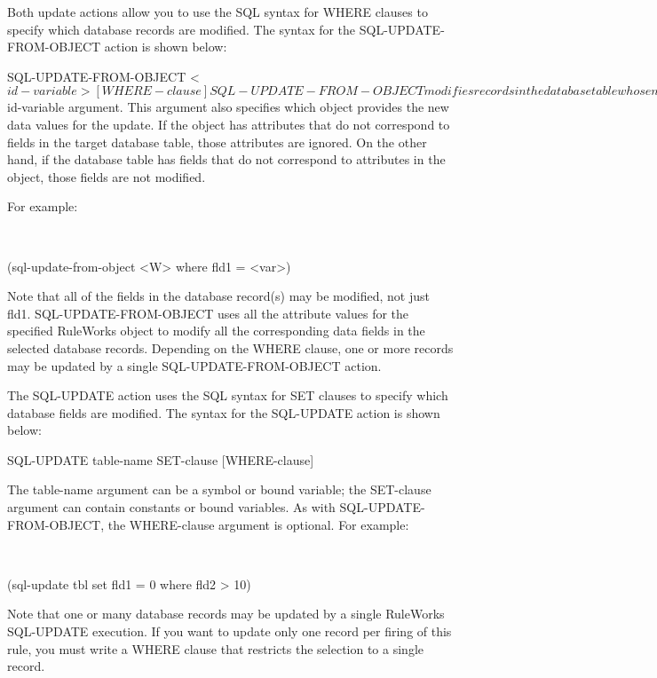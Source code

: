       Both update actions allow you to use the SQL
      syntax for WHERE clauses to specify which
      database records are modified. The syntax for
      the SQL-UPDATE-FROM-OBJECT action is shown
      below:

      SQL-UPDATE-FROM-OBJECT <$id-variable> [
      WHERE-clause ]

      SQL-UPDATE-FROM-OBJECT modifies records in
      the database table whose name matches the
      OBJECT-CLASS of the WMO specified by the
      $id-variable argument. This argument also
      specifies which object provides the new data
      values for the update. If the object has
      attributes that do not correspond to fields
      in the target database table, those
      attributes are ignored. On the other hand, if
      the database table has fields that do not
      correspond to attributes in the object, those
      fields are not modified.

      For example:

       

      (sql-update-from-object <W> where fld1 =
      <var>)

      Note that all of the fields in the database
      record(s) may be modified, not just fld1.
      SQL-UPDATE-FROM-OBJECT uses all the attribute
      values for the specified RuleWorks object to
      modify all the corresponding data fields in
      the selected database records. Depending on
      the WHERE clause, one or more records may be
      updated by a single SQL-UPDATE-FROM-OBJECT
      action.

      The SQL-UPDATE action uses the SQL syntax for
      SET clauses to specify which database fields
      are modified. The syntax for the SQL-UPDATE
      action is shown below:

      SQL-UPDATE table-name SET-clause
      [WHERE-clause]

      The table-name argument can be a symbol or
      bound variable; the SET-clause argument can
      contain constants or bound variables. As with
      SQL-UPDATE-FROM-OBJECT, the WHERE-clause
      argument is optional. For example:

       

      (sql-update tbl set fld1 = 0 where fld2 > 10)

      Note that one or many database records may be
      updated by a single RuleWorks SQL-UPDATE
      execution. If you want to update only one
      record per firing of this rule, you must
      write a WHERE clause that restricts the
      selection to a single record.

